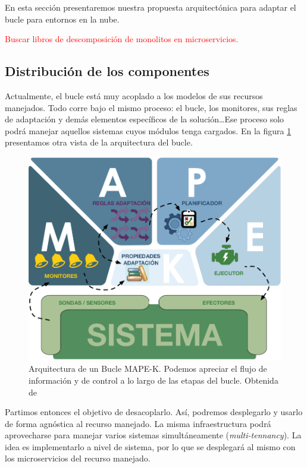 En esta sección presentaremos nuestra propuesta arquitectónica para adaptar el bucle para entornos en la nube.

\textcolor{red}{Buscar libros de descomposición de monolitos en microservicios.}

\subsection{Distribución de los componentes}

Actualmente, el bucle está muy acoplado a los modelos de sus recursos manejados. Todo corre bajo el mismo proceso: el bucle, los monitores, sus reglas de adaptación y demás elementos específicos de la solución\dots Ese proceso solo podrá manejar aquellos sistemas cuyos módulos tenga cargados. En la figura \ref{fig:bucle-mapek2} presentamos otra vista de la arquitectura del bucle.

\begin{figure}[htb]
  \centering
  \includegraphics[scale=1.15]{cap_introduccion/images/bucle-mape-k}
  \caption[Arquitectura de un Bucle MAPE-K. Podemos apreciar el flujo de información y de control a lo largo de las etapas del bucle.]{Arquitectura de un Bucle MAPE-K. Podemos apreciar el flujo de información y de control a lo largo de las etapas del bucle. Obtenida de \cite{fonsEspecificacionSistemasAutoadaptativos2021}}
  \label{fig:bucle-mapek2}
\end{figure}

Partimos entonces el objetivo de desacoplarlo. Así, podremos desplegarlo y usarlo de forma agnóstica al recurso manejado. La misma infraestructura podrá aprovecharse para manejar varios sistemas simultáneamente (\emph{multi-tennancy}). La idea es implementarlo a nivel de sistema\cite{mendoncaGeneralityVsReusability2018}, por lo que se desplegará al mismo con los microservicios del recurso manejado.

